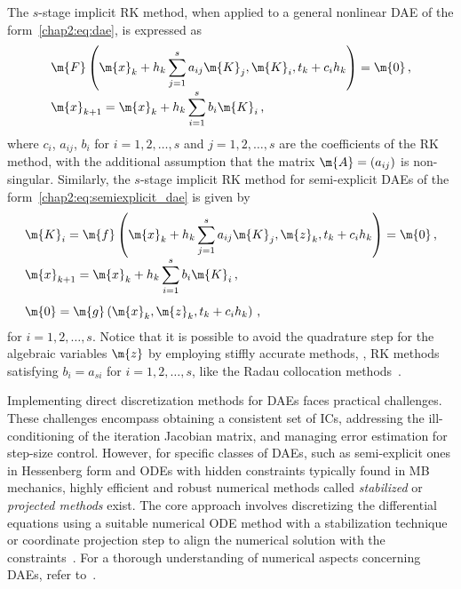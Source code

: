 The $s$-stage implicit \ac{RK} method, when applied to a general nonlinear \ac{DAE} of the form~\eqref{chap2:eq:dae}, is expressed as
%
\begin{equation*}
  \begin{array}{l}
    \m{F}\left(\m{x}_{k} + h_k\displaystyle\sum_{j=1}^{s}a_{ij} \m{K}_j, \m{K}_i, t_{k} + c_i h_k\right) = \m{0} \, \text{,} \\[1em]
    \m{x}_{k+1} = \m{x}_{k} + h_k\displaystyle\sum_{i=1}^{s} b_i \m{K}_i \, \text{,}
  \end{array}
\end{equation*}
%
where $c_i$, $a_{ij}$, $b_i$ for $i = 1, 2, \dots, s$ and $j = 1, 2, \dots, s$ are the coefficients of the \ac{RK} method, with the additional assumption that the matrix $\m{A} = (a_{ij})$ is non-singular. Similarly, the $s$-stage implicit \ac{RK} method for semi-explicit \acp{DAE} of the form~\eqref{chap2:eq:semiexplicit_dae} is given by
%
\begin{equation*}
  \begin{array}{l}
    \m{K}_i = \m{f}\left(\m{x}_{k} + h_k\displaystyle\sum_{j=1}^{s}a_{ij} \m{K}_j, \m{z}_{k}, t_{k} + c_i h_k\right) = \m{0} \, \text{,} \\[1em]
    \m{x}_{k+1} = \m{x}_{k} + h_k\displaystyle\sum_{i=1}^{s} b_i \m{K}_i \, \text{,} \\[1.75em]
    \m{0} = \m{g}\left(\m{x}_{k}, \m{z}_{k}, t_{k} + c_i h_k\right) \, \text{,}
  \end{array}
\end{equation*}
%
for $i = 1, 2, \dots, s$. Notice that it is possible to avoid the quadrature step for the algebraic variables $\m{z}$ by employing stiffly accurate methods, \ie{}, \ac{RK} methods satisfying $b_i = a_{si}$ for $i = 1, 2, \dots, s$, like the Radau collocation methods~\cite{martinvaquero2010radau, brenan1995numerical}.

\vspace{1.0em}

Implementing direct discretization methods for \acp{DAE} faces practical challenges. These challenges encompass obtaining a consistent set of \acp{IC}, addressing the ill-conditioning of the iteration Jacobian matrix, and managing error estimation for step-size control. However, for specific classes of \acp{DAE}, such as semi-explicit ones in Hessenberg form and \acp{ODE} with hidden constraints typically found in \ac{MB} mechanics, highly efficient and robust numerical methods called \emph{stabilized} or \emph{projected methods} exist. The core approach involves discretizing the differential equations using a suitable numerical \ac{ODE} method with a stabilization technique or coordinate projection step to align the numerical solution with the constraints~\cite{eichsoellner1998numerical}. For a thorough understanding of numerical aspects concerning \acp{DAE}, refer to~\cite{ascher1998computer, brenan1995numerical, hairer1999stiff}.

